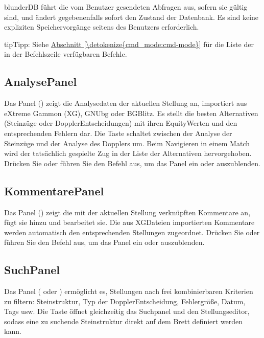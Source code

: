 \documentclass[letterpaper,10pt,german]{sphinxmanual}
\begin{document}
\sphinxAtStartPar
blunderDB führt die vom Benutzer gesendeten Abfragen aus, sofern sie gültig sind, und ändert gegebenenfalls sofort den Zustand der Datenbank. Es sind keine expliziten Speichervorgänge seitens des Benutzers erforderlich.

\begin{sphinxadmonition}{tip}{Tipp:}
\sphinxAtStartPar
Siehe \hyperref[\detokenize{cmd_mode:cmd-mode}]{Abschnitt \ref{\detokenize{cmd_mode:cmd-mode}}} für die Liste der in der Befehlszeile verfügbaren Befehle.
\end{sphinxadmonition}


\subsection{Analyse\sphinxhyphen{}Panel}
\label{\detokenize{manuel:panneau-analyse}}\label{\detokenize{manuel:id3}}
\sphinxAtStartPar
Das Panel  () zeigt die Analysedaten der aktuellen Stellung an, importiert aus eXtreme Gammon (XG), GNUbg oder BGBlitz. Es stellt die besten Alternativen (Steinzüge oder Doppler\sphinxhyphen{}Entscheidungen) mit ihren Equity\sphinxhyphen{}Werten und den entsprechenden Fehlern dar. Die Taste  schaltet zwischen der Analyse der Steinzüge und der Analyse des Dopplers um. Beim Navigieren in einem Match wird der tatsächlich gespielte Zug in der Liste der Alternativen hervorgehoben. Drücken Sie  oder führen Sie den Befehl  aus, um das Panel ein\sphinxhyphen{} oder auszublenden.


\subsection{Kommentare\sphinxhyphen{}Panel}
\label{\detokenize{manuel:panneau-commentaires}}\label{\detokenize{manuel:id4}}
\sphinxAtStartPar
Das Panel  () zeigt die mit der aktuellen Stellung verknüpften Kommentare an, fügt sie hinzu und bearbeitet sie. Die aus XG\sphinxhyphen{}Dateien importierten Kommentare werden automatisch den entsprechenden Stellungen zugeordnet. Drücken Sie  oder führen Sie den Befehl  aus, um das Panel ein\sphinxhyphen{} oder auszublenden.


\subsection{Such\sphinxhyphen{}Panel}
\label{\detokenize{manuel:panneau-recherche}}\label{\detokenize{manuel:id5}}
\sphinxAtStartPar
Das Panel  ( oder ) ermöglicht es, Stellungen nach frei kombinierbaren Kriterien zu filtern: Steinstruktur, Typ der Doppler\sphinxhyphen{}Entscheidung, Fehlergröße, Datum, Tags usw. Die Taste  öffnet gleichzeitig das Suchpanel und den Stellungseditor, sodass eine zu suchende Steinstruktur direkt auf dem Brett definiert werden kann.
\end{document}
